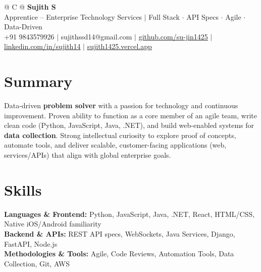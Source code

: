 \documentclass[a4paper,10pt]{article}
\newcommand{\ulink}[2]{\href{#1}{\uline{#2}}}
\begin{document}
\pagestyle{empty}

\begin{tabularx}{\linewidth}{@{} C @{}}
{\color[HTML]{000000}\fontsize{30}{35}\selectfont\bfseries Sujith S} \\[5pt]
{\fontsize{10.5}{12.5}\selectfont\color[HTML]{3A3A3A}
Apprentice -- Enterprise Technology Services $|$ Full Stack $\cdot$ API Specs $\cdot$ Agile $\cdot$ Data-Driven} \\[6pt]
{\fontsize{9.5}{11.5}\selectfont\textcolor[HTML]{3A3A3A}{+91 9843579926 $|$ sujithssd14@gmail.com $|$ \ulink{https://github.com/su-jin1425}{github.com/su-jin1425} $|$ \ulink{https://linkedin.com/in/sujith14}{linkedin.com/in/sujith14} $|$ \ulink{https://sujith1425.vercel.app}{sujith1425.vercel.app}}}
\end{tabularx}

\vspace{1pt}

\section{Summary}
\vspace{1pt}
{\color[HTML]{0A0A0A}\fontsize{11}{14}\selectfont
Data-driven \textbf{problem solver} with a passion for technology and continuous improvement. Proven ability to function as a core member of an agile team, write clean code (Python, JavaScript, Java, .NET), and build web-enabled systems for \textbf{data collection}. Strong intellectual curiosity to explore proof of concepts, automate tools, and deliver scalable, customer-facing applications (web, services/APIs) that align with global enterprise goals.}

\vspace{1pt}

\section{Skills}
\vspace{1pt}
{\color[HTML]{0A0A0A}\fontsize{11}{14}\selectfont
\textbf{Languages \& Frontend:} Python, JavaScript, Java, .NET, React, HTML/CSS, Native iOS/Android familiarity \\[2pt]
\textbf{Backend \& APIs:} REST API specs, WebSockets, Java Services, Django, FastAPI, Node.js \\[2pt]
\textbf{Methodologies \& Tools:} Agile, Code Reviews, Automation Tools, Data Collection, Git, AWS}
\end{document}
